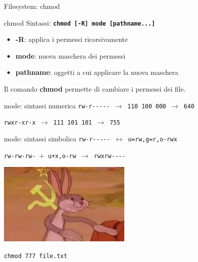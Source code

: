 \documentclass{beamer}
\begin{document}
    \begin{frame}{Filesystem: chmod}
        \begin{block}{chmod}
            \small
            Sintassi: \texttt{\textbf{chmod [-R] mode [pathname...]}}

            \begin{itemize}
                \item \textbf{-R}: applica i permessi ricorsivamente
                \item \textbf{mode}: nuova maschera dei permessi
                \item \textbf{pathname}: oggetti a cui applicare la nuova maschera
            \end{itemize}

            Il comando \textbf{chmod} permette di cambiare i permessi dei file.
        \end{block}

        \begin{alertblock}{mode: sintassi numerica}
            \small
            \texttt{rw-r-{}-{}-{}-{}- $\rightarrow$ 110 100 000 $\rightarrow$ 640}

            \texttt{rwxr-xr-x $\rightarrow$ 111 101 101 $\rightarrow$ 755}
        \end{alertblock}

        \begin{alertblock}{mode: sintassi simbolica}
            \small
            \texttt{rw-r-{}-{}-{}-{}- $\leftrightarrow$ u=rw,g=r,o-rwx}
        
            \texttt{rw-rw-rw- $+$ u+x,o-rw $\rightarrow$ rwxrw-{}-{}-{}-}
        \end{alertblock}
    \end{frame}

    \begin{frame}{}
        \centering
        \includegraphics[height=4cm, keepaspectratio]{images/bugs-bunny-communist.png}
        
        \vspace{0.5cm}
        
        \Large \texttt{chmod 777 file.txt}
    \end{frame}
\end{document}
